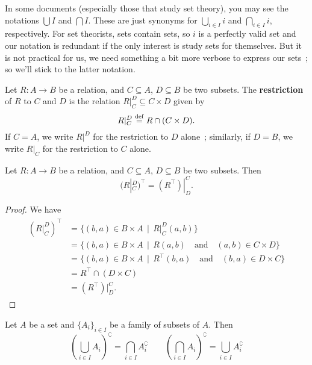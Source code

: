 \begin{remark}
	In some documents (especially those that study set theory), you may see the notations $\bigcup I$ and $\bigcap I$. These are just synonyms for $\bigcup_{i \in I} i$ and $\bigcap_{i \in I} i$, respectively. For set theorists, sets contain sets, so $i$ is a perfectly valid set and our notation is redundant if the only interest is study sets for themselves. But it is not practical for us, we need something a bit more verbose to express our sets~; so we'll stick to the latter notation.
\end{remark}

\begin{definition} \label{restriction-of-relations}
	Let $R : A \to B$ be a relation, and $C \subseteq A$, $D \subseteq B$ be two subsets. The \textbf{restriction} of $R$ to $C$ and $D$ is the relation $R|_C^D \subseteq C \times D$ given by 
	\[
		R|_C^D \overset{\mathrm{def}}{=} R \cap (C \times D).	
	\]
	If $C = A$, we write $R|^D$ for the restriction to $D$ alone~; similarly, if $D=B$, we write $R|_C$ for the restriction to $C$ alone. 
\end{definition}

\begin{proposition}
	Let $R : A \to B$ be a relation, and $C \subseteq A$, $D \subseteq B$ be two subsets. Then
	\[
		(R|_C^D)^{\top} = (R^{\top})|_D^C.	
	\]
\end{proposition}

\begin{proof}
	We have 
	\begin{gather*}
		\begin{aligned}
			(R|_C^D)^{\top} 
			& = \{ (b,a) \in B \times A \, \mid \, R|_C^D(a,b) \}	\\
			& = \{ (b,a) \in B \times A \, \mid \, R(a,b) \quad \text{and} \quad (a,b) \in C \times D \}	\\
			& = \{ (b,a) \in B \times A \, \mid \, R^{\top}(b,a) \quad \text{and} \quad (b,a) \in D \times C \}	\\
			& = R^{\top} \cap (D \times C)	\\
			& = (R^{\top})|_D^C.
		\end{aligned}
	\end{gather*}
\end{proof}

\begin{theorem} \label{de-morgan-laws} %
	Let $A$ be a set and $\{A_i\}_{i \in I}$ be a family of subsets of $A$. Then
	\[
		\left( \bigcup_{i \in I} A_i \right)^{\complement} = \bigcap_{i \in I} A_i^{\complement} \qquad \left( \bigcap_{i \in I} A_i \right)^{\complement} = \bigcup_{i \in I} A_i^{\complement}
	\]
\end{theorem}

